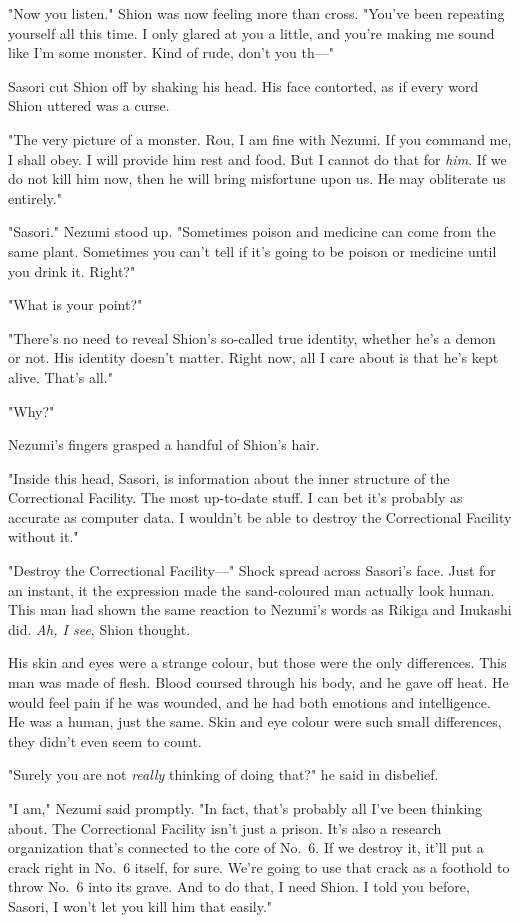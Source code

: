 "Now you listen." Shion was now feeling more than cross. "You've been
repeating yourself all this time. I only glared at you a little, and
you're making me sound like I'm some monster. Kind of rude, don't you
th---"

Sasori cut Shion off by shaking his head. His face contorted, as if
every word Shion uttered was a curse.

"The very picture of a monster. Rou, I am fine with Nezumi. If you
command me, I shall obey. I will provide him rest and food. But I cannot
do that for \emph{him}. If we do not kill him now, then he will bring
misfortune upon us. He may obliterate us entirely."

"Sasori." Nezumi stood up. "Sometimes poison and medicine can come from
the same plant. Sometimes you can't tell if it's going to be poison or
medicine until you drink it. Right?"

"\el What is your point?"

"There's no need to reveal Shion's so-called true identity, whether he's
a demon or not. His identity doesn't matter. Right now, all I care about
is that he's kept alive. That's all."

"Why?"

Nezumi's fingers grasped a handful of Shion's hair.

"Inside this head, Sasori, is information about the inner structure of
the Correctional Facility. The most up-to-date stuff. I can bet it's
probably as accurate as computer data. I wouldn't be able to destroy the
Correctional Facility without it."

"Destroy the Correctional Facility---" Shock spread across Sasori's face.
Just for an instant, it the expression made the sand-coloured man
actually look human. This man had shown the same reaction to Nezumi's
words as Rikiga and Inukashi did. \emph{Ah, I see}, Shion thought.

His skin and eyes were a strange colour, but those were the only
differences. This man was made of flesh. Blood coursed through his body,
and he gave off heat. He would feel pain if he was wounded, and he had
both emotions and intelligence. He was a human, just the same. Skin and
eye colour were such small differences, they didn't even seem to count.

"Surely you are not \emph{really} thinking of doing that?" he said in
disbelief.

"I am," Nezumi said promptly. "In fact, that's probably all I've been
thinking about. The Correctional Facility isn't just a prison. It's also
a research organization that's connected to the core of No.~6. If we
destroy it, it'll put a crack right in No.~6 itself, for sure. We're
going to use that crack as a foothold to throw No.~6 into its grave. And
to do that, I need Shion. I told you before, Sasori, I won't let you
kill him that easily."


